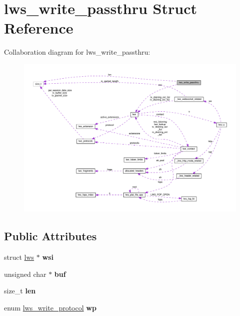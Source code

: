 \hypertarget{structlws__write__passthru}{}\section{lws\+\_\+write\+\_\+passthru Struct Reference}
\label{structlws__write__passthru}


Collaboration diagram for lws\+\_\+write\+\_\+passthru\+:
\nopagebreak
\begin{figure}[H]
\begin{center}
\leavevmode
\includegraphics[width=350pt]{structlws__write__passthru__coll__graph}
\end{center}
\end{figure}
\subsection*{Public Attributes}
\begin{DoxyCompactItemize}
\item 
\mbox{\label{structlws__write__passthru_ac90185b28da90085605ade2d895ba24f}} 
struct \hyperlink{structlws}{lws} $\ast$ {\bfseries wsi}
\item 
\mbox{\label{structlws__write__passthru_ade2a448ae7b206c6c17580dbefbc652c}} 
unsigned char $\ast$ {\bfseries buf}
\item 
\mbox{\label{structlws__write__passthru_aa99cfab9c79dad24ec4c4c437559a939}} 
size\+\_\+t {\bfseries len}
\item 
\mbox{\label{structlws__write__passthru_af89f752852e013e9fea1c8486318b57e}} 
enum \hyperlink{group__sending-data_ga98b099cf8c1c7e38ad78501f270e193d}{lws\+\_\+write\+\_\+protocol} {\bfseries wp}
\end{DoxyCompactItemize}


